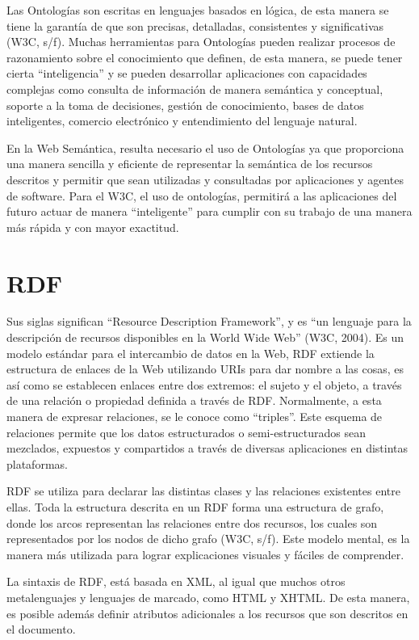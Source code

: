 Las Ontologías son escritas en lenguajes basados en lógica, de esta manera se tiene la garantía de que son precisas, detalladas, consistentes y significativas (W3C, s/f). Muchas herramientas para Ontologías pueden realizar procesos de razonamiento sobre el conocimiento que definen, de esta manera, se puede tener cierta ``inteligencia'' y se pueden desarrollar aplicaciones con capacidades complejas como consulta de información de manera semántica y conceptual, soporte a la toma de decisiones, gestión de conocimiento, bases de datos inteligentes, comercio electrónico y entendimiento del lenguaje natural.

En la Web Semántica, resulta necesario el uso de Ontologías ya que proporciona una manera sencilla y eficiente de representar la semántica de los recursos descritos y permitir que sean utilizadas y consultadas por aplicaciones y agentes de software. Para el W3C, el uso de ontologías, permitirá a las aplicaciones del futuro actuar de manera ``inteligente'' para cumplir con su trabajo de una manera más rápida y con mayor exactitud.

\section{RDF}

Sus siglas significan ``Resource Description Framework'', y es ``un lenguaje para la descripción de recursos disponibles en la World Wide Web'' (W3C, 2004). Es un modelo estándar para el intercambio de datos en la Web, RDF extiende la estructura de enlaces de la Web utilizando URIs para dar nombre a las cosas, es así como se establecen enlaces entre dos extremos: el sujeto y el objeto, a través de una relación o propiedad definida a través de RDF. Normalmente, a esta manera de expresar relaciones, se le conoce como ``triples''. Este esquema de relaciones permite que los datos estructurados o semi-estructurados sean mezclados, expuestos y compartidos a través de diversas aplicaciones en distintas plataformas.

RDF se utiliza para declarar las distintas clases y las relaciones existentes entre ellas. Toda la estructura descrita en un RDF forma una estructura de grafo, donde los arcos representan las relaciones entre dos recursos, los cuales son representados por los nodos de dicho grafo (W3C, s/f). Este modelo mental, es la manera más utilizada para lograr explicaciones visuales y fáciles de comprender.

La sintaxis de RDF, está basada en XML, al igual que muchos otros metalenguajes y lenguajes de marcado, como HTML y XHTML. De esta manera, es posible además definir atributos adicionales a los recursos que son descritos en el documento.

